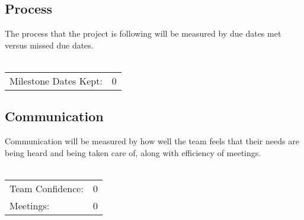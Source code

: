 \documentclass{article}
\begin{document}
\subsection{Process}
The process that the project is following will be measured by due dates met versus missed due dates.\\ \\
\begin{tabular}{l r}
Milestone Dates Kept: & 0 \\
\end{tabular}

\subsection{Communication}
Communication will be measured by how well the team feels that their needs are being heard and being taken care of, along with efficiency of meetings.\\ \\
\begin{tabular}{l r}
Team Confidence: & 0 \\
Meetings: & 0 \\
\end{tabular}
\end{document}

